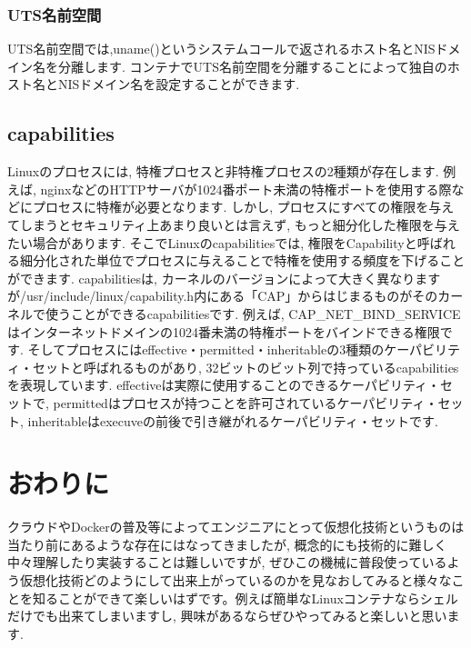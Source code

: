 \subsubsection{UTS名前空間}
UTS名前空間では,uname()というシステムコールで返されるホスト名とNISドメイン名を分離します. コンテナでUTS名前空間を分離することによって独自のホスト名とNISドメイン名を設定することができます.
\subsection{capabilities}
Linuxのプロセスには, 特権プロセスと非特権プロセスの2種類が存在します. 例えば, nginxなどのHTTPサーバが1024番ポート未満の特権ポートを使用する際などにプロセスに特権が必要となります. しかし, プロセスにすべての権限を与えてしまうとセキュリティ上あまり良いとは言えず, もっと細分化した権限を与えたい場合があります. そこでLinuxのcapabilitiesでは, 権限をCapabilityと呼ばれる細分化された単位でプロセスに与えることで特権を使用する頻度を下げることができます. capabilitiesは, カーネルのバージョンによって大きく異なりますが/usr/include/linux/capability.h内にある「CAP」からはじまるものがそのカーネルで使うことができるcapabilitiesです. 例えば, CAP\_NET\_BIND\_SERVICEはインターネットドメインの1024番未満の特権ポートをバインドできる権限です. そしてプロセスにはeffective・permitted・inheritableの3種類のケーパビリティ・セットと呼ばれるものがあり, 32ビットのビット列で持っているcapabilitiesを表現しています. effectiveは実際に使用することのできるケーパビリティ・セットで, permittedはプロセスが持つことを許可されているケーパビリティ・セット, inheritableはexecuveの前後で引き継がれるケーパビリティ・セットです.
\section{おわりに}
クラウドやDockerの普及等によってエンジニアにとって仮想化技術というものは当たり前にあるような存在にはなってきましたが, 概念的にも技術的に難しく中々理解したり実装することは難しいですが, ぜひこの機械に普段使っているよう仮想化技術どのようにして出来上がっているのかを見なおしてみると様々なことを知ることができて楽しいはずです。例えば簡単なLinuxコンテナならシェルだけでも出来てしまいますし, 興味があるならぜひやってみると楽しいと思います.
